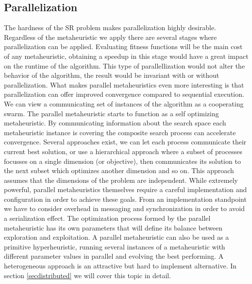 \subsection{Parallelization}
The hardness of the SR problem makes parallelization highly desirable. Regardless of the metaheuristic we apply there are several stages where parallelization can be applied. Evaluating fitness functions will be the main cost of any metaheuristic, obtaining a speedup in this stage would have a great impact on the runtime of the algorithm. This type of parallellization would not alter the behavior of the algorithm, the result would be invariant with or without parallelization. 
What makes parallel metaheuristics even more interesting is that parallelization can offer improved convergence compared to sequential execution. We can view a communicating set of instances of the algorithm as a cooperating swarm. The parallel metaheuristic starts to function as a self optimizing metaheuristic. By communicating information about the search space each metaheuristic instance is covering the composite search process can accelerate convergence. 
Several approaches exist, we can let each process communicate their current best solution, or use a hierarchical approach where a subset of processes focusses on a single dimension (or objective), then communicates its solution to the next subset which optimizes another dimension and so on. This approach assumes that the dimensions of the problem are independent.
While extremely powerful, parallel metaheuristics themselves require a careful implementation and configuration in order to achieve these goals. From an implementation standpoint we have to consider overhead in messaging and synchronization in order to avoid a serialization effect. The optimization process formed by the parallel metaheuristic has its own parameters that will define its balance between exploration and exploitation. A parallel metaheuristic can also be used as a primitive hyperheuristic, running several instances of a metaheuristic with different parameter values in parallel and evolving the best performing. A heterogeneous approach is an attractive but hard to implement alternative. In section \ref{secdistributed} we will cover this topic in detail.